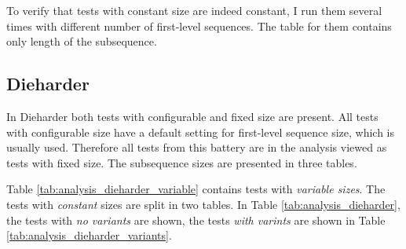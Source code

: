 \documentclass[
  digital,     %
  oneside,     %
  nosansbold,  %
  nocolorbold, %
  nolof,         %
  nolot,         %
]{fithesis4}
\begin{document}
To verify that tests with constant size are indeed constant, I run them several times with different number of first-level sequences. The table for them contains only length of the subsequence.



\subsection{Dieharder}

In Dieharder both tests with configurable and fixed size are present. All tests with configurable size have a default setting for first-level sequence size, which is usually used. Therefore all tests from this battery are in the analysis viewed as tests with fixed size. The subsequence sizes are presented in three tables.

Table \ref{tab:analysis_dieharder_variable} contains tests with \emph{variable sizes}. The tests with \emph{constant} sizes are split in two tables. In Table \ref{tab:analysis_dieharder}, the tests with \emph{no variants} are shown, the tests \emph{with varints} are shown in Table \ref{tab:analysis_dieharder_variants}.
\end{document}
